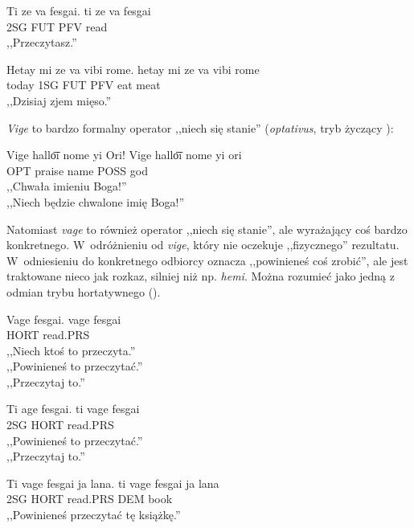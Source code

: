 \begin{spacing}{1.1}
\begin{exe}
	\ex
	\trans Ti ze va fesgai.
	\gll  ti ze va fesgai\\
	  2SG FUT PFV read \\
	\glt  ,,Przeczytasz.''
\end{exe}

\begin{exe}
	\ex
	\trans Hetay mi ze va vibi rome.
	\gll hetay mi ze va vibi rome\\
		today 1SG FUT PFV eat meat \\
	\glt  ,,Dzisiaj zjem mięso.''
\end{exe}

\emph{Vige} to bardzo formalny operator ,,niech się stanie'' (\emph{optativus},
tryb życzący \Opt{}):

\begin{exe}
	\ex
	\trans Vige hallo͞i nome yi Ori!
	\gll  Vige hallo͞i nome yi ori \\
	  OPT praise name POSS god \\
	\glt  ,,Chwała imieniu Boga!'' \\ ,,Niech będzie chwalone imię Boga!''
\end{exe}

Natomiast \emph{vage} to również operator ,,niech się stanie'', ale wyrażający
coś bardzo konkretnego. W~odróżnieniu od \emph{vige}, który nie
oczekuje ,,fizycznego'' rezultatu. W~odniesieniu do konkretnego odbiorcy
oznacza ,,powinieneś coś zrobić'', ale jest traktowane nieco jak rozkaz,
silniej niż np. \emph{hemi}. Można rozumieć jako jedną z odmian trybu
hortatywnego (\Hort{}).

\begin{exe}
	\ex
	\trans Vage fesgai.
	\gll  vage fesgai\\
	  HORT read.PRS\\
	\glt  ,,Niech ktoś to przeczyta.'' \\ ,,Powinieneś to przeczytać.'' \\ ,,Przeczytaj to.''
\end{exe}

\begin{exe}
	\ex
	\trans Ti age fesgai.
	\gll  ti vage fesgai\\
	  2SG HORT read.PRS\\
	\glt ,,Powinieneś to przeczytać.'' \\ ,,Przeczytaj to.''
\end{exe}

\begin{exe}
	\ex
	\trans Ti vage fesgai ja lana.
	\gll  ti vage fesgai ja lana\\
	  2SG HORT read.PRS DEM book\\
	\glt  ,,Powinieneś przeczytać tę książkę.''
\end{exe}


\end{spacing}
